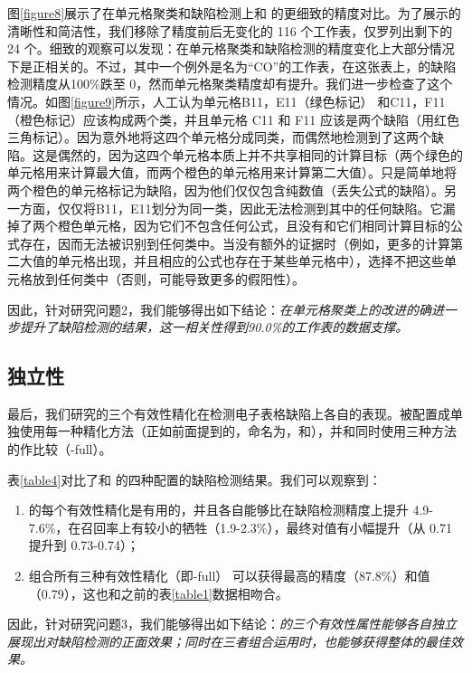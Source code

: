 图\ref{figure8}展示了在单元格聚类和缺陷检测上\wa 和 \cu 的更细致的精度对比。为了展示的清晰性和简洁性，我们移除了精度前后无变化的 116 个工作表，仅罗列出剩下的 24 个。细致的观察可以发现：在单元格聚类和缺陷检测的精度变化上大部分情况下是正相关的。不过，其中一个例外是名为“CO”的工作表，在这张表上，\wa 的缺陷检测精度从100\%跌至 0，然而单元格聚类精度却有提升。我们进一步检查了这个情况。如图\ref{figure9}所示，人工认为单元格{B11，E11}（绿色标记） 和{C11，F11}（橙色标记）应该构成两个类，并且单元格 C11 和 F11 应该是两个缺陷（用红色三角标记）。\cu 因为意外地将这四个单元格分成同类，而偶然地检测到了这两个缺陷。这是偶然的，因为这四个单元格本质上并不共享相同的计算目标（两个绿色的单元格用来计算最大值，而两个橙色的单元格用来计算第二大值）。\cu 只是简单地将两个橙色的单元格标记为缺陷，因为他们仅仅包含纯数值（丢失公式的缺陷）。另一方面，\wa 仅仅将{B11，E11}划分为同一类，因此无法检测到其中的任何缺陷。它漏掉了两个橙色单元格，因为它们不包含任何公式，且没有和它们相同计算目标的公式存在，因而无法被识别到任何类中。当没有额外的证据时（例如，更多的计算第二大值的单元格出现，并且相应的公式也存在于某些单元格中），\wa 选择不把这些单元格放到任何类中（否则，可能导致更多的假阳性）。

因此，针对研究问题2，我们能够得出如下结论：\textit{\wa 在单元格聚类上的改进的确进一步提升了缺陷检测的结果，这一相关性得到90.0\%的工作表的数据支撑。}


\subsection{独立性}



最后，我们研究\wa 的三个有效性精化在检测电子表格缺陷上各自的表现。\wa 被配置成单独使用每一种精化方法（正如前面提到的，命名为\wasc，\wamc 和\wawc ），并和同时使用三种方法的\wa 作比较（\wa -full）。

表\ref{table4}对比了\cu 和 \wa 的四种配置的缺陷检测结果。我们可以观察到：
\begin{enumerate}
    \item \wa 的每个有效性精化是有用的，并且各自能够比\cu 在缺陷检测精度上提升 4.9-7.6\%，在召回率上有较小的牺牲（1.9-2.3\%），最终对\fmd 值有小幅提升（从 0.71 提升到 0.73-0.74）；
    \item 组合所有三种有效性精化（即\wa -full） 可以获得最高的精度（87.8\%）和\fmd 值（0.79），这也和之前的表\ref{table1}数据相吻合。
\end{enumerate}

因此，针对研究问题3，我们能够得出如下结论：\textit{\wa 的三个有效性属性能够各自独立展现出对缺陷检测的正面效果；同时在三者组合运用时，也能够获得整体的最佳效果。}